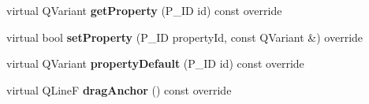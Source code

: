 \begin{DoxyCompactItemize}
virtual Q\+Variant {\bfseries get\+Property} (P\+\_\+\+ID id) const override
\item 
\mbox{\label{class_ms_1_1_line_segment_a62b1702c4715dc9ef18df419b9c9ce2a}} 
virtual bool {\bfseries set\+Property} (P\+\_\+\+ID property\+Id, const Q\+Variant \&) override
\item 
\mbox{\label{class_ms_1_1_line_segment_ae526a2fe6e4a19de383123f77e6bae08}} 
virtual Q\+Variant {\bfseries property\+Default} (P\+\_\+\+ID id) const override
\item 
\mbox{\label{class_ms_1_1_line_segment_aed445c20147c887dc9c6be35e65daf62}} 
virtual Q\+LineF {\bfseries drag\+Anchor} () const override
\end{DoxyCompactItemize}
